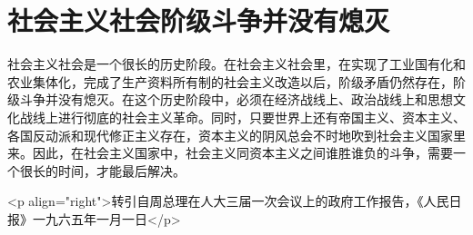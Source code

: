 \section[社会主义社会阶级斗争并没有熄灭（一九六四年）]{社会主义社会阶级斗争并没有熄灭}


社会主义社会是一个很长的历史阶段。在社会主义社会里，在实现了工业国有化和农业集体化，完成了生产资料所有制的社会主义改造以后，阶级矛盾仍然存在，阶级斗争并没有熄灭。在这个历史阶段中，必须在经济战线上、政治战线上和思想文化战线上进行彻底的社会主义革命。同时，只要世界上还有帝国主义、资本主义、各国反动派和现代修正主义存在，资本主义的阴风总会不时地吹到社会主义国家里来。因此，在社会主义国家中，社会主义同资本主义之间谁胜谁负的斗争，需要一个很长的时间，才能最后解决。

<p align="right">转引自周总理在人大三届一次会议上的政府工作报告，《人民日报》一九六五年一月一日</p>


